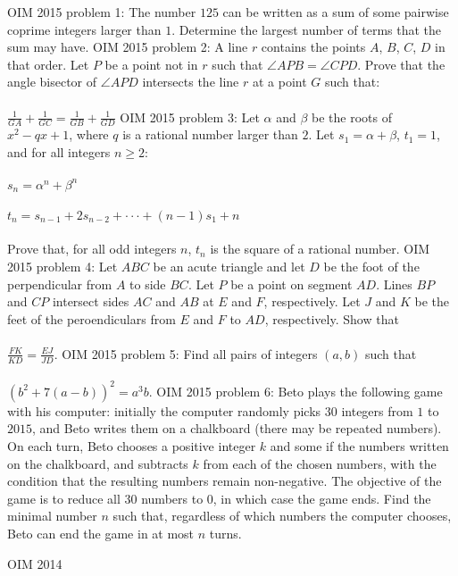 OIM 2015 problem 1:  The number $125$ can be written as a sum of some pairwise coprime integers larger than $1$. Determine the largest number of terms that the sum may have. 
OIM 2015 problem 2:  A line $r$ contains the points $A$, $B$, $C$, $D$ in that order. Let $P$ be a point not in $r$ such that $\angle{APB} = \angle{CPD}$. Prove that the angle bisector of $\angle{APD}$ intersects the line $r$ at a point $G$ such that: \\\\
$\frac{1}{GA} + \frac{1}{GC} = \frac{1}{GB} + \frac{1}{GD}$ 
OIM 2015 problem 3:  Let $\alpha$ and $\beta$ be the roots of $x^2 - qx + 1$, where $q$ is a rational number larger than $2$. Let $s_1 = \alpha + \beta$, $t_1 = 1$, and for all integers $n \geq 2$: \\\\
$s_n = \alpha^n + \beta^n$ \\\\
$t_n = s_{n-1} + 2s_{n-2} + \cdot \cdot \cdot + (n - 1)s_1 + n$ \\\\
Prove that, for all odd integers $n$, $t_n$ is the square of a rational number. 
OIM 2015 problem 4:  Let $ABC$ be an acute triangle and let $D$ be the foot of the perpendicular from $A$ to side $BC$. Let $P$ be a point on segment $AD$. Lines $BP$ and $CP$ intersect sides $AC$ and $AB$ at $E$ and $F$, respectively. Let $J$ and $K$ be the feet of the peroendiculars from $E$ and $F$ to $AD$, respectively. Show that \\\\
$\frac{FK}{KD}=\frac{EJ}{JD}$. 
OIM 2015 problem 5:  Find all pairs of integers $(a,b)$ such that \\\\
$(b^2+7(a-b))^2=a^3b$. 
OIM 2015 problem 6:  Beto plays the following game with his computer: initially the computer randomly picks $30$ integers from $1$ to $2015$, and Beto writes them on a chalkboard (there may be repeated numbers). On each turn, Beto chooses a positive integer $k$ and some if the numbers written on the chalkboard, and subtracts $k$ from each of the chosen numbers, with the condition that the resulting numbers remain non-negative. The objective of the game is to reduce all $30$ numbers to $0$, in which case the game ends. Find the minimal number $n$ such that, regardless of which numbers the computer chooses, Beto can end the game in at most $n$ turns. 

OIM 2014 

